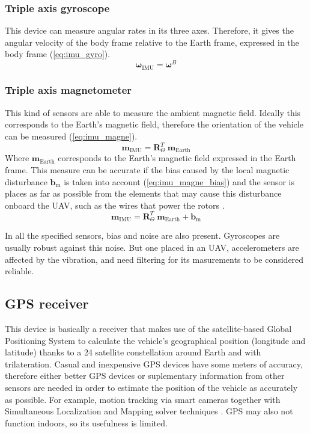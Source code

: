\documentclass[journal]{IEEEtran}
\newcommand*{\subb}[1]{_{\mathrm{#1}}}
\begin{document}
		\subsubsection{Triple axis gyroscope} This device can measure angular rates in its three axes. Therefore, it  gives the angular velocity of the body frame relative to the Earth frame, expressed in the body frame (\ref{eq:imu_gyro}).\\
		\begin{equation} \label{eq:imu_gyro}
		\bm{\omega}\subb{IMU}= \bm{\omega}^B 
		\end{equation}
		
		\subsubsection{Triple axis magnetometer} This kind of sensors are able to measure the ambient magnetic field. Ideally this corresponds to the Earth's magnetic field, therefore the orientation of the vehicle can be measured (\ref{eq:imu_magne}).
		\begin{equation} \label{eq:imu_magne}
		\bm{m}\subb{IMU}= \bm{R}^T_\Theta \  \bm{m}\subb{Earth}
		\end{equation}
		Where $\bm{m}\subb{Earth}$ corresponds to the Earth's magnetic field expressed in the Earth frame. This measure can be accurate if the bias caused by the local magnetic disturbance $\bm{b}\subb{m}$ is taken into account (\ref{eq:imu_magne_bias}) and the sensor is places as far as possible from the elements that may cause this disturbance onboard the UAV, such as the wires that power the rotors \cite{modelling_control_mahony}.
		\begin{equation} \label{eq:imu_magne_bias}
		\bm{m}\subb{IMU}= \bm{R}^T_\Theta \  \bm{m}\subb{Earth} + \bm{b}\subb{m}
		\end{equation}
		
		In all the specified sensors, bias and noise are also present. Gyroscopes are usually robust against this noise. But one placed in an UAV, accelerometers are affected by the vibration, and need filtering for its masurements to be considered reliable.
		
		\subsection{GPS receiver}
		This device is basically a receiver that makes use of the satellite-based Global Positioning System to calculate the vehicle's geographical position (longitude and latitude) thanks to a 24 satellite constellation around Earth and with trilateration. Casual and inexpensive GPS devices have some meters of accuracy, therefore either better GPS devices or suplementary information from other sensors are needed in order to estimate the position of the vehicle as accurately as possible. For example, motion tracking via smart cameras together with Simultaneous Localization and Mapping solver techniques \cite{modelling_control_mahony}. GPS may also not function indoors, so its usefulness is limited.
		
\end{document}
